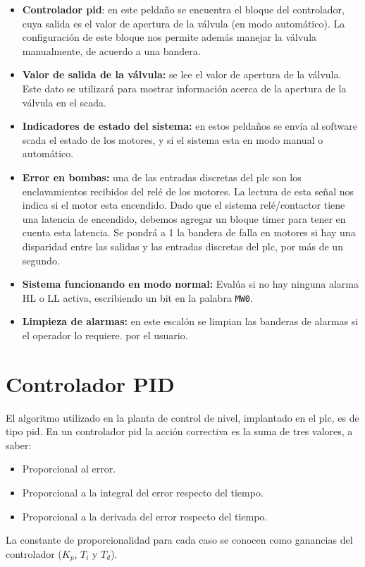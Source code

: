 \begin{itemize}
  \item \textbf{Controlador \gls{pid}}: en este peldaño se encuentra el bloque
del controlador, cuya salida es el valor de apertura de la
válvula (en modo automático).
  La configuración de este bloque nos permite además manejar la válvula
manualmente, de acuerdo a una bandera.
  \item \textbf{Valor de salida de la válvula:} se lee el valor de apertura de
la válvula. Este dato se utilizará para mostrar información acerca de la
apertura de la válvula en el \gls{scada}.
  \item \textbf{Indicadores de estado del sistema:} en estos peldaños se envía
al software \gls{scada}
  el estado de los motores, y si el sistema esta en modo manual o automático.
  \item \textbf{Error en bombas:} una de las entradas discretas del \gls{plc}
son los enclavamientos recibidos del relé de los motores. La lectura de esta
señal nos indica si el motor esta encendido.
  Dado que el sistema relé/contactor tiene una latencia de encendido, debemos
agregar un bloque timer para tener en cuenta esta latencia.
  Se pondrá a 1 la bandera de falla en motores si hay una disparidad entre las
salidas y las entradas discretas del \gls{plc}, por más de un segundo.
  \item \textbf{Sistema funcionando en modo normal:}
  Evalúa si no hay ninguna alarma HL o LL activa, escribiendo un bit en la
palabra \verb|MW0|.
  \item \textbf{Limpieza de alarmas:} en este escalón se limpian las banderas
de alarmas si el operador lo requiere.
  por el usuario.
\end{itemize}

\section{Controlador PID}
\label{sec:controladorpid}

El algoritmo utilizado en la planta de control de nivel, implantado en el
\gls{plc}, es de tipo \gls{pid}.
En un controlador \gls{pid} la acción correctiva es la suma de tres valores, a
saber:

\begin{itemize}
 \item Proporcional al error.
 \item Proporcional a la integral del error respecto del tiempo.
 \item Proporcional a la derivada del error respecto del tiempo.
\end{itemize}
La constante de proporcionalidad para cada caso se conocen como ganancias del
controlador ($K_p$, $T_i$ y $T_d$).

